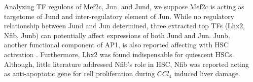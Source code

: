 \documentclass[fleqn,10pt]{wlscirep}
\begin{document}
\begin{itemize}
        Analyzing TF regulons of Mef2c, Jun, and Jund, we suppose Mef2c is acting as targetome of Jund and inter-regulatory element of Jun.
        While no regulatory relationship between Jund and Jun determined, three extracted top TFs (Lhx2, Nfib, Junb) can potentially affect expressions of both Jund and Jun.
        Junb, another functional component of AP1, is also reported affecting with HSC activation \cite{ap1_hsc_5}.
        Furthermore, Lhx2 was found indispensable for quiescent HSCs. \cite{lhx2_fibro, Lhx2_hsc_1}
        Although, little literature addressed Nfib's role in HSC, Nfib was reported acting as anti-apoptotic gene for cell proliferation during $CCl_4$ induced liver damage. \cite{Nfib_sadly}
    \end{itemize}

\end{document}
